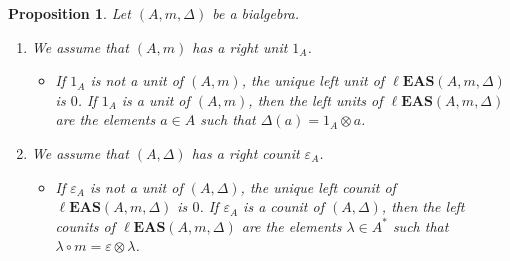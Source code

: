 \documentclass[10pt,a4paper]{amsart}
\numberwithin{equation}{section}
\newtheorem{Proposition}[Theorem]{Proposition}
 { \theoremstyle{definition}
\newtheorem{Definition}[Theorem]{Definition}
\newtheorem{Note}[Theorem]{Note}
\newtheorem{Example}[Theorem]{Example}
\newtheorem{Remark}[Theorem]{Remark}
\newtheorem{Notation}[Theorem]{Notation}}
\newcommand{\leas}{\ell\mathbf{EAS}}
\begin{document}
\begin{Proposition}\label{prop5.4}
Let $(A,m,\Delta)$ be a bialgebra.
\begin{enumerate}\itemsep=0pt
\item[$(1)$] We assume that $(A,m)$ has a right unit $1_A$.
\begin{itemize}\itemsep=0pt
\item If $1_A$ is not a unit of $(A,m)$, the unique left unit of $\leas(A,m,\Delta)$ is $0$. If $1_A$ is a unit of $(A,m)$, then the left units of $\leas(A,m,\Delta)$ are the elements $a\in A$ such that $\Delta(a)=1_A\otimes a$.
\end{itemize}
\item[$(2)$] We assume that $(A,\Delta)$ has a right counit $\varepsilon_A$.
\begin{itemize}\itemsep=0pt
\item If $\varepsilon_A$ is not a unit of $(A,\Delta)$, the unique left counit of $\leas(A,m,\Delta)$ is $0$. If $\varepsilon_A$ is a counit of $(A,\Delta)$, then the left counits of $\leas(A,m,\Delta)$ are the elements $\lambda \in A^*$
such that $\lambda \circ m=\varepsilon\otimes \lambda$.
\end{itemize}\end{enumerate}\end{Proposition}
\end{document}
